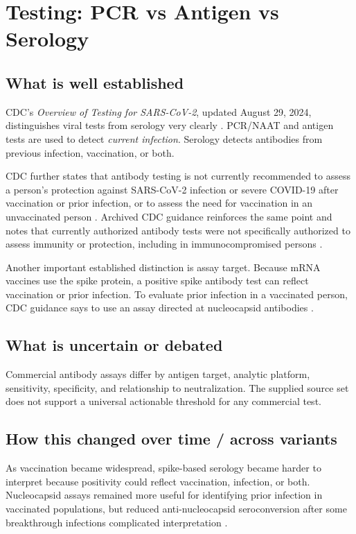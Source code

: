 \documentclass[12pt]{article}
\begin{document}
\section{Testing: PCR vs Antigen vs Serology}
\subsection*{What is well established}
CDC's \emph{Overview of Testing for SARS-CoV-2}, updated August 29, 2024, distinguishes viral tests from serology very clearly \cite{ref1}. PCR/NAAT and antigen tests are used to detect \emph{current infection}. Serology detects antibodies from previous infection, vaccination, or both.

CDC further states that antibody testing is not currently recommended to assess a person's protection against SARS-CoV-2 infection or severe COVID-19 after vaccination or prior infection, or to assess the need for vaccination in an unvaccinated person \cite{ref1}. Archived CDC guidance reinforces the same point and notes that currently authorized antibody tests were not specifically authorized to assess immunity or protection, including in immunocompromised persons \cite{ref8}.

Another important established distinction is assay target. Because mRNA vaccines use the spike protein, a positive spike antibody test can reflect vaccination or prior infection. To evaluate prior infection in a vaccinated person, CDC guidance says to use an assay directed at nucleocapsid antibodies \cite{ref1,ref7}.

\subsection*{What is uncertain or debated}
Commercial antibody assays differ by antigen target, analytic platform, sensitivity, specificity, and relationship to neutralization. The supplied source set does not support a universal actionable threshold for any commercial test.

\subsection*{How this changed over time / across variants}
As vaccination became widespread, spike-based serology became harder to interpret because positivity could reflect vaccination, infection, or both. Nucleocapsid assays remained more useful for identifying prior infection in vaccinated populations, but reduced anti-nucleocapsid seroconversion after some breakthrough infections complicated interpretation \cite{ref1,ref8}.
\end{document}
